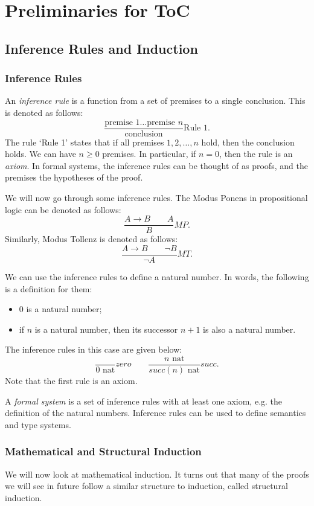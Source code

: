 \documentclass[a4paper, openany]{memoir}
\begin{document}
    \chapter{Preliminaries for ToC}

    \section{Inference Rules and Induction}
    \subsection{Inference Rules}
    An \emph{inference rule} is a function from a set of premises to a single conclusion. This is denoted as follows:
    \[\frac{\textrm{premise 1} \dots \textrm{premise } n}{\textrm{conclusion}} \textrm{Rule } 1.\]
    The rule `Rule 1' states that if all premises $1, 2, \dots, n$ hold, then the conclusion holds. We can have $n \geq 0$ premises. In particular, if $n = 0$, then the rule is an \emph{axiom}. In formal systems, the inference rules can be thought of as proofs, and the premises the hypotheses of the proof.

    We will now go through some inference rules. The Modus Ponens in propositional logic can be denoted as follows:
    \[\frac{A \to B \qquad A}{B} MP.\]
    Similarly, Modus Tollenz is denoted as follows:
    \[\frac{A \to B \qquad \lnot B}{\lnot A} MT.\]

    We can use the inference rules to define a natural number. In words, the following is a definition for them:
    \begin{itemize}
        \item $0$ is a natural number;
        \item if $n$ is a natural number, then its successor $n+1$ is also a natural number.
    \end{itemize}
    The inference rules in this case are given below:
    \[\frac{}{0 \textrm{ nat}} zero \qquad \frac{n \textrm{ nat}}{succ(n) \textrm{ nat}} succ.\]
    Note that the first rule is an axiom.

    A \emph{formal system} is a set of inference rules with at least one axiom, e.g. the definition of the natural numbers. Inference rules can be used to define semantics and type systems.

    \subsection{Mathematical and Structural Induction}
    We will now look at mathematical induction. It turns out that many of the proofs we will see in future follow a similar structure to induction, called structural induction.
\end{document}
